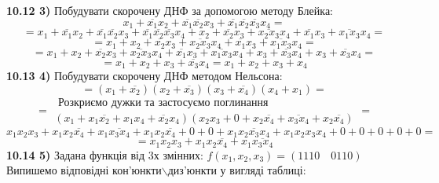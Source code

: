 \documentclass[14pt,a4paper]{scrartcl}
\theoremstyle{definition}
\newtheorem{defo}{Означення}[section]
\theoremstyle{remark}
\theoremstyle{definition}
\theoremstyle{definition}
\begin{document}
\def\be{\begin{equation}}
\def\ee{\end{equation}}

\def\bd{\begin{defo}}
\def\ed{\end{defo}}

\def\bbt{\begin{boxteo}}
\def\ebt{\end{boxteo}}
\textbf{10.12 3)} Побудувати скорочену ДНФ за допомогою методу Блейка:\\
$$x_1 + \overline{x_1} x_2 + \overline{x_1} \overline{x_2} x_3 + \overline{x_1}\overline{x_2}\overline{x_3}x_4 = $$
$$=x_1 + \overline{x_1}x_2 +\overline{x_1} \overline{x_2} x_3 + \overline{x_1}\overline{x_2}\overline{x_3}x_4+ x_2 + \overline{x_2} x_3 + \overline{x_2x_3}x_4 + \overline{x_1}x_3 + \overline{x_1x_3}x_4 = $$
$$= x_1 + x_2 + \overline{x_2}x_3 + \overline{x_2x_3}x_4 + \overline{x_1}x_3 + \overline{x_1x_3}x_4 =$$
$$= x_1 + x_2 + \overline{x_2}x_3 + \overline{x_2x_3}x_4 + \overline{x_1}x_3 + \overline{x_1x_3}x_4 + x_3 +\overline{x_3}x_4 + x_3 + \overline{x_3}x_4=$$
$$= x_1 + x_2  + x_3 + \overline{x_3}x_4= x_1 + x_2 + x_3 + x_4$$
\textbf{10.13 4)} Побудувати скорочену ДНФ методом Нельсона:\\
$$=
(x_1 + \overline{x_2})(x_2 + \overline{x_3}) (x_3 + \overline{x_4})(x_4 + x_1)
=$$
$$ = \begin{gathered}
  \text{ Розкриємо дужки та застосуємо поглинання }\\
  (x_1 + x_1 \overline{x_2} + x_1x_4 + \overline{x_2}x_4 )(x_2x_3 + 0 + x_2 \overline{x_4} + \overline{x_3x_4} + x_2 \overline{x_4})
\end{gathered} =
$$
$$
x_1x_2x_3 + x_1x_2 \overline{x_4} + x_1 \overline{x_3 x_4} + x_1 x_2 \overline{x_4} + 0 +0 + x_1 \overline{x_2x_3x_4} + x_1x_2x_3x_4 + 0 + 0 + 0 + 0 + 0 =
$$
$$
= x_1x_2x_3 + x_1 x_2 \overline{x_4} + x_1 \overline{x_3 x_4}
$$
\textbf{10.14 5)}
Задана функція від 3х змінних: $f(x_1, x_2, x_3) = (1110\quad 0110)$\\
Випишемо відповідні кон'юнкти$\backslash$диз'юнкти у вигляді таблиці: \\
\end{document}
